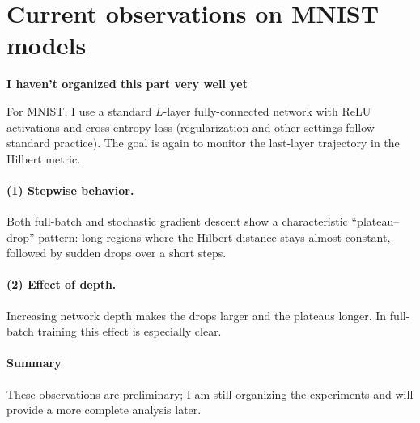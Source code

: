 \documentclass[11pt]{article}
\begin{document}
\section{Current observations on MNIST models }
\textbf{I haven't organized this part very well yet }

For MNIST, I use a standard $L$-layer fully-connected network with ReLU
activations and cross-entropy loss (regularization and other settings follow
standard practice).  The goal is again to monitor the last-layer trajectory in
the Hilbert metric.

\paragraph{(1) Stepwise behavior.}
Both full-batch and stochastic gradient descent show a characteristic
``plateau--drop''  pattern: long regions where the Hilbert distance stays almost
constant, followed by sudden drops over a short steps.

\paragraph{(2) Effect of depth.}
Increasing network depth makes the drops larger and the plateaus longer.
In full-batch training this effect is especially clear.

\paragraph{Summary}
These observations are preliminary; I am still organizing the experiments and
will provide a more complete analysis later.
\end{document}
